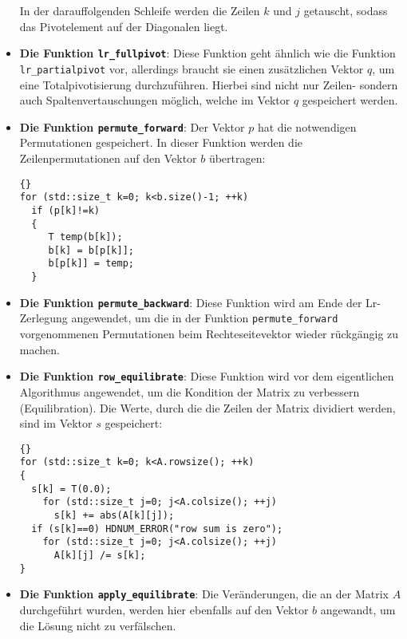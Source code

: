 \documentclass[a4paper,11pt]{article}
\theoremstyle{definition}
\begin{document}
\begin{itemize}
  In der darauffolgenden Schleife werden die Zeilen $k$ und $j$
  getauscht, sodass das Pivotelement auf der Diagonalen liegt.

\item \textbf{Die Funktion \lstinline{lr_fullpivot}}: Diese Funktion
  geht ähnlich wie die Funktion \lstinline{lr_partialpivot} vor,
  allerdings braucht sie einen zusätzlichen Vektor $q$, um eine
  Totalpivotisierung durchzuführen. Hierbei sind nicht nur Zeilen-
  sondern auch Spaltenvertauschungen möglich, welche im Vektor $q$
  gespeichert werden.

\item \textbf{Die Funktion \lstinline{permute_forward}}: Der Vektor
  $p$ hat die notwendigen Permutationen gespeichert. In dieser
  Funktion werden die Zeilenpermutationen auf den Vektor $b$
  übertragen:

{\footnotesize{\begin{lstlisting}{}
for (std::size_t k=0; k<b.size()-1; ++k)
  if (p[k]!=k)
  {
     T temp(b[k]);
     b[k] = b[p[k]];
     b[p[k]] = temp;
  }
\end{lstlisting}}}

\item \textbf{Die Funktion \lstinline{permute_backward}}: Diese
  Funktion wird am Ende der Lr-Zerlegung angewendet, um die in der
  Funktion \lstinline{permute_forward} vorgenommenen Permutationen
  beim Rechteseitevektor wieder rückgängig zu machen.


\item \textbf{Die Funktion \lstinline{row_equilibrate}}: Diese
  Funktion wird vor dem eigentlichen Algorithmus angewendet, um die
  Kondition der Matrix zu verbessern (Equilibration).  Die Werte,
  durch die die Zeilen der Matrix dividiert werden, sind im Vektor $s$
  gespeichert:

{\footnotesize{\begin{lstlisting}{}
for (std::size_t k=0; k<A.rowsize(); ++k)
{
  s[k] = T(0.0);
    for (std::size_t j=0; j<A.colsize(); ++j)
      s[k] += abs(A[k][j]);
  if (s[k]==0) HDNUM_ERROR("row sum is zero");
    for (std::size_t j=0; j<A.colsize(); ++j)
      A[k][j] /= s[k];
}
\end{lstlisting}}}


\item \textbf{Die Funktion \lstinline{apply_equilibrate}}: Die
  Veränderungen, die an der Matrix $A$ durchgeführt wurden, werden
  hier ebenfalls auf den Vektor $b$ angewandt, um die Lösung nicht zu
  verfälschen.


\end{itemize}
\end{document}
